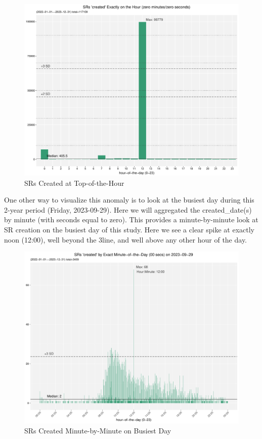 \documentclass[12pt, titlepage]{article}
\begin{document}
{	\begin{figure}[tbp]
		\centering
 		\includegraphics[width = \textwidth]{2-year-trend-SR_created_by_top_of_hour.pdf}
		\caption{SRs Created at Top-of-the-Hour}
		\label{fig:tophourcreated}
	\end{figure}	

	One other way to visualize this anomaly is to look at the busiest day during this 2-year period (Friday, 2023-09-29).
	Here we will aggregated the created\_date(s) by minute (with seconds equal to zero). This provides a 
	minute-by-minute look at SR creation on the busiest day of this study. Here we see a clear spike at 
	exactly noon (12:00), well beyond the 3\textsigma line, and well above any other hour of the day.
	
	\begin{figure}[tbp]
		\centering
		\includegraphics[width=\textwidth]{2-year-trend-SR_created_by_minute_of_busiest_day.pdf}
		\caption{SRs Created Minute-by-Minute on Busiest Day}
		\label{fig:busiestcreated}
	\end{figure}	

}
\end{document}
